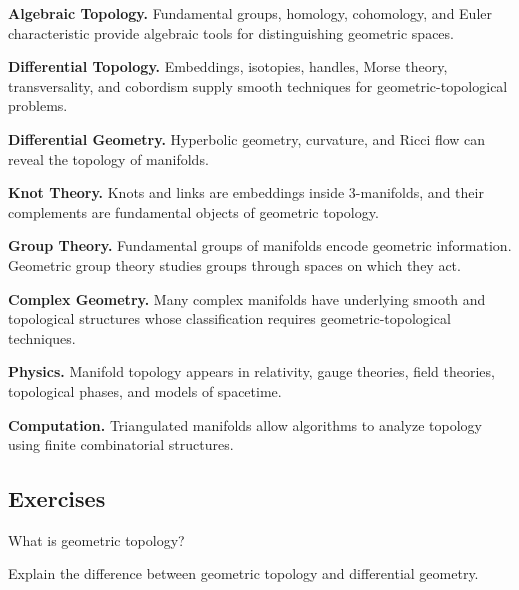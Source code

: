 \begin{applicationbox}
\textbf{Algebraic Topology.}
Fundamental groups, homology, cohomology, and Euler characteristic provide
algebraic tools for distinguishing geometric spaces.

\medskip

\textbf{Differential Topology.}
Embeddings, isotopies, handles, Morse theory, transversality, and cobordism
supply smooth techniques for geometric-topological problems.

\medskip

\textbf{Differential Geometry.}
Hyperbolic geometry, curvature, and Ricci flow can reveal the topology of
manifolds.

\medskip

\textbf{Knot Theory.}
Knots and links are embeddings inside \(3\)-manifolds, and their complements
are fundamental objects of geometric topology.

\medskip

\textbf{Group Theory.}
Fundamental groups of manifolds encode geometric information. Geometric
group theory studies groups through spaces on which they act.

\medskip

\textbf{Complex Geometry.}
Many complex manifolds have underlying smooth and topological structures
whose classification requires geometric-topological techniques.

\medskip

\textbf{Physics.}
Manifold topology appears in relativity, gauge theories, field theories,
topological phases, and models of spacetime.

\medskip

\textbf{Computation.}
Triangulated manifolds allow algorithms to analyze topology using finite
combinatorial structures.
\end{applicationbox}

\subsection{Exercises}
\label{subsec:geometric-topology-exercises}

\begin{exercise}[1]
What is geometric topology?
\end{exercise}

\begin{exercise}[1]
Explain the difference between geometric topology and differential geometry.
\end{exercise}

